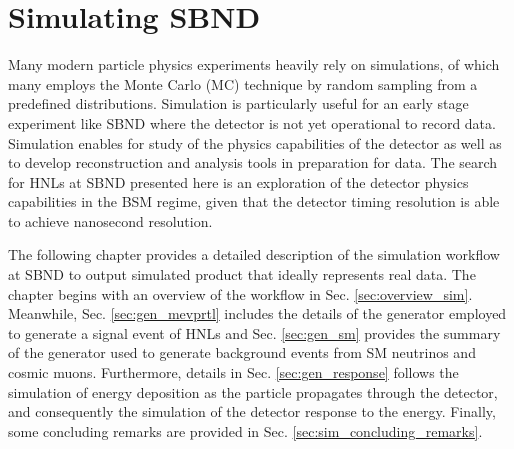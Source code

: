 
\chapter{Simulating SBND}
\label{ChapterSim}

\ifpdf
    \graphicspath{{Chapter6/Figs/Raster/}{Chapter6/Figs/PDF/}{Chapter6/Figs/}}
\else
    \graphicspath{{Chapter6/Figs/Vector/}{Chapter6/Figs/}}
\fi


Many modern particle physics experiments heavily rely on simulations, of which many employs the Monte Carlo (MC) technique by random sampling from a predefined distributions.
Simulation is particularly useful for an early stage experiment like SBND where the detector is not yet operational to record data.
Simulation enables for study of the physics capabilities of the detector as well as to develop reconstruction and analysis tools in preparation for data.
The search for HNLs at SBND presented here is an exploration of the detector physics capabilities in the BSM regime, given that the detector timing resolution is able to achieve nanosecond resolution.

The following chapter provides a detailed description of the simulation workflow at SBND to output simulated product that ideally represents real data.
The chapter begins with an overview of the workflow in Sec. \ref{sec:overview_sim}.
Meanwhile, Sec. \ref{sec:gen_mevprtl} includes the details of the generator employed to generate a signal event of HNLs and Sec. \ref{sec:gen_sm} provides the summary of the generator used to generate background events from SM neutrinos and cosmic muons.
Furthermore, details in Sec. \ref{sec:gen_response} follows the simulation of energy deposition as the particle propagates through the detector, and consequently the simulation of the detector response to the energy.
Finally, some concluding remarks are provided in Sec. \ref{sec:sim_concluding_remarks}.

\newpage

